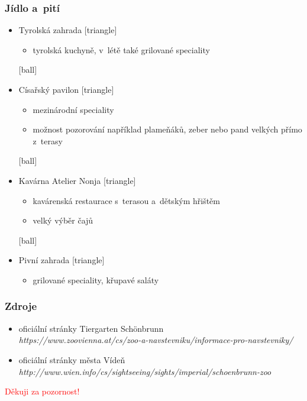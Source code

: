 \documentclass[pdf]{beamer}
\begin{document}
\begin{frame}
\frametitle{Jídlo a~pití}
\begin{itemize}
\item{Tyrolská zahrada}
[triangle]
\begin{itemize}
\item{tyrolská kuchyně, v~létě také grilované speciality}
\end{itemize}
[ball]
\item{Císařský pavilon}
[triangle]
\begin{itemize}
\item{mezinárodní speciality}
\item{možnost pozorování například plameňáků, zeber nebo pand velkých přímo z~terasy}
\end{itemize}
[ball]
\item{Kavárna Atelier Nonja}
[triangle]
\begin{itemize}
\item{kavárenská restaurace s~terasou a~dětským hřištěm}
\item{velký výběr čajů}
\end{itemize}
[ball]
\item{Pivní zahrada}
[triangle]
\begin{itemize}
\item{grilované speciality, křupavé saláty}
\end{itemize}
\end{itemize}
\end{frame}

\begin{frame}
\frametitle{Zdroje}
\begin{itemize}
\item{oficiální stránky Tiergarten Sch\"{o}nbrunn \\ 
\emph{https://www.zoovienna.at/cs/zoo-a-navstevniku/informace-pro-navstevniky/}}
\item{oficiální stránky města Vídeň \\
\emph{http://www.wien.info/cs/sightseeing/sights/imperial/schoenbrunn-zoo}}
\end{itemize}
\end{frame}

\begin{frame}
\begin{center}
\Huge{\textcolor{red}{Děkuji za pozornost!}}
\end{center}
\end{frame}
\end{document}
